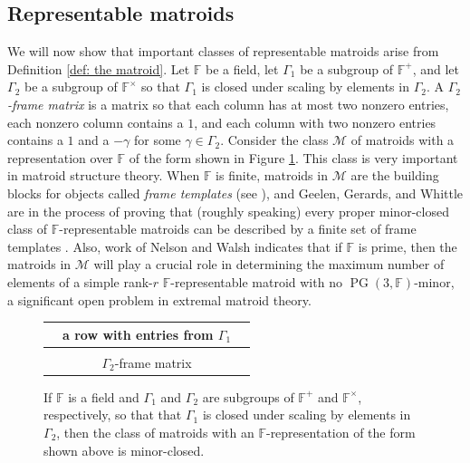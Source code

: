 \documentclass[12pt]{article}
\theoremstyle{definition}
\newcommand{\bF}{\mathbb F}
\newcommand{\cM}{\mathcal{M}}
\DeclareMathOperator{\PG}{PG}
\begin{document}
\subsection{Representable matroids} \label{sec: the representable case}

We will now show that important classes of representable matroids arise from Definition \ref{def: the matroid}.
Let $\bF$ be a field, let $\Gamma_1$ be a subgroup of $\bF^{+}$, and let $\Gamma_2$ be a subgroup of $\bF^{\times}$ so that $\Gamma_1$ is closed under scaling by elements in $\Gamma_2$.
A \emph{$\Gamma_2$-frame matrix} is a matrix so that each column has at most two nonzero entries, each nonzero column contains a $1$, and each column with two nonzero entries contains a $1$ and a $-\gamma$ for some $\gamma \in \Gamma_2$.
Consider the class $\cM$ of matroids with a representation over $\bF$ of the form shown in Figure \ref{fig: special representable matroids}.
This class is very important in matroid structure theory.
When $\bF$ is finite, matroids in $\cM$ are the building blocks for objects called \emph{frame templates} (see \cite[page 6]{Structure_Theory}), and Geelen, Gerards, and Whittle are in the process of proving that (roughly speaking) every proper minor-closed class of $\bF$-representable matroids can be described by a finite set of frame templates \cite[Theorem 4.2]{Structure_Theory}.
Also, work of Nelson and Walsh \cite{Nelson-Walsh2022} indicates that if $\bF$ is prime, then the matroids in $\cM$ will play a crucial role in determining the maximum number of elements of a simple rank-$r$ $\bF$-representable matroid with no $\PG(3, \bF)$-minor, a significant open problem in extremal matroid theory.




\begin{figure}
\begin{center}
\begin{tabular}{|ccc|}
\hline 
& a row with entries from $\Gamma_1$ & \\
\hline 
& & \\
& $\Gamma_2$-frame matrix & \\ [0.5cm]
\hline
\end{tabular}
\end{center}
\caption{If $\bF$ is a field and $\Gamma_1$ and $\Gamma_2$ are subgroups of $\bF^+$ and $\bF^{\times}$, respectively, so that that $\Gamma_1$ is closed under scaling by elements in $\Gamma_2$, then the class of matroids with an $\bF$-representation of the form shown above is minor-closed.}
\label{fig: special representable matroids}
\end{figure}
\end{document}
